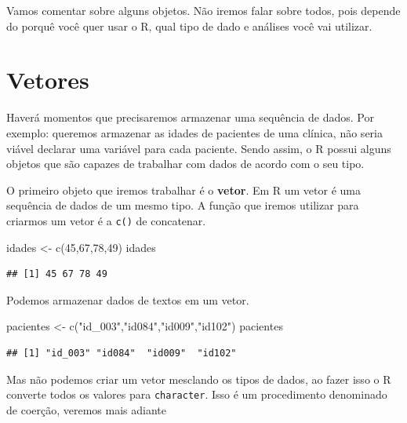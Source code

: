 \documentclass[
]{book}
\newenvironment{Shaded}{\begin{snugshade}}{\end{snugshade}}
\newcommand{\DecValTok}[1]{\textcolor[rgb]{0.00,0.00,0.81}{#1}}
\newcommand{\FunctionTok}[1]{\textcolor[rgb]{0.00,0.00,0.00}{#1}}
\newcommand{\NormalTok}[1]{#1}
\newcommand{\OtherTok}[1]{\textcolor[rgb]{0.56,0.35,0.01}{#1}}
\newcommand{\StringTok}[1]{\textcolor[rgb]{0.31,0.60,0.02}{#1}}
\begin{document}
Vamos comentar sobre alguns objetos. Não iremos falar sobre todos, pois depende do porquê você quer usar o R, qual tipo de dado e análises você vai utilizar.

\hypertarget{vetores}{%
\section{Vetores}\label{vetores}}

Haverá momentos que precisaremos armazenar uma sequência de dados. Por exemplo: queremos armazenar as idades de pacientes de uma clínica, não seria viável declarar uma variável para cada paciente. Sendo assim, o R possui alguns objetos que são capazes de trabalhar com dados de acordo com o seu tipo.

O primeiro objeto que iremos trabalhar é o \textbf{vetor}. Em R um vetor é uma sequência de dados de um mesmo tipo. A função que iremos utilizar para criarmos um vetor é a \texttt{c()} de concatenar.

\begin{Shaded}
\begin{Highlighting}[]
\NormalTok{idades }\OtherTok{\textless{}{-}} \FunctionTok{c}\NormalTok{(}\DecValTok{45}\NormalTok{,}\DecValTok{67}\NormalTok{,}\DecValTok{78}\NormalTok{,}\DecValTok{49}\NormalTok{)}
\NormalTok{idades}
\end{Highlighting}
\end{Shaded}

\begin{verbatim}
## [1] 45 67 78 49
\end{verbatim}

Podemos armazenar dados de textos em um vetor.

\begin{Shaded}
\begin{Highlighting}[]
\NormalTok{pacientes }\OtherTok{\textless{}{-}} \FunctionTok{c}\NormalTok{(}\StringTok{"id\_003"}\NormalTok{,}\StringTok{"id084"}\NormalTok{,}\StringTok{"id009"}\NormalTok{,}\StringTok{"id102"}\NormalTok{)}
\NormalTok{pacientes}
\end{Highlighting}
\end{Shaded}

\begin{verbatim}
## [1] "id_003" "id084"  "id009"  "id102"
\end{verbatim}

Mas não podemos criar um vetor mesclando os tipos de dados, ao fazer isso o R converte todos os valores para \texttt{character}. Isso é um procedimento denominado de coerção, veremos mais adiante
\end{document}
